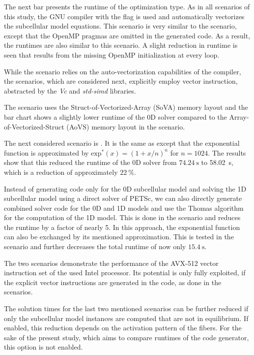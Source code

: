 The next bar presents the runtime of the  optimization type. As in all scenarios of this study, the GNU compiler with the  flag is used and automatically vectorizes the subcellular model equations. This scenario is very similar to the  scenario, except that the OpenMP pragmas are omitted in the generated code. As a result, the runtimes are also similar to this scenario. A slight reduction in runtime is seen that results from the missing OpenMP initialization at every loop.

While the  scenario relies on the auto-vectorization capabilities of the compiler, the  scenarios, which are considered next, explicitly employ vector instruction, abstracted by the \emph{Vc} and \emph{std-simd} libraries. 

The  scenario uses the Struct-of-Vectorized-Array (SoVA) memory layout and the bar chart shows a slightly lower runtime of the 0D solver compared to the Array-of-Vectorized-Struct (AoVS) memory layout in the  scenario.

The next considered scenario is . It is the same as  except that the exponential function is approximated by $\textrm{exp}^\ast(x)=(1+x/n)^n$ for $n=1024$. The results show that this reduced the runtime of the 0D solver from $\SI{74.24}{\s}$ to \SI{58.02}{\s}, which is a reduction of approximately $\SI{22}{\percent}$.

Instead of generating code only for the 0D subcellular model and solving the 1D subcellular model using a direct solver of PETSc, we can also directly generate combined solver code for the 0D and 1D models and use the Thomas algorithm for the computation of the 1D model. This is done in the  scenario and reduces the runtime by a factor of nearly 5. In this approach, the exponential function can also be exchanged by its mentioned approximation. This is tested in the  scenario and further decreases the total runtime of now only $\SI{15.4}{\s}$.

The two  scenarios demonstrate the performance of the AVX-512 vector instruction set of the used Intel processor. Its potential is only fully exploited, if the explicit vector instructions are generated in the code, as done in the  scenarios.

The solution times for the last two mentioned scenarios can be further reduced if only the subcellular model instances are computed that are not in equilibrium. If enabled, this reduction depends on the activation pattern of the fibers. For the sake of the present study, which aims to compare runtimes of the code generator, this option is not enabled.

